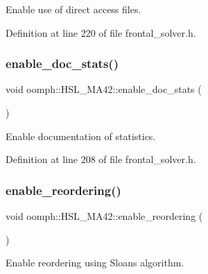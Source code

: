Enable use of direct access files. 



Definition at line 220 of file frontal\+\_\+solver.\+h.

\mbox{\label{classoomph_1_1HSL__MA42_a52f7aec686418a4210ab8bd010eb332a}} 
\subsubsection{\texorpdfstring{enable\+\_\+doc\+\_\+stats()}{enable\_doc\_stats()}}
{\footnotesize\ttfamily void oomph\+::\+H\+S\+L\+\_\+\+M\+A42\+::enable\+\_\+doc\+\_\+stats (\begin{DoxyParamCaption}{ }\end{DoxyParamCaption})\hspace{0.3cm}{\ttfamily [inline]}}



Enable documentation of statistics. 



Definition at line 208 of file frontal\+\_\+solver.\+h.

\mbox{\label{classoomph_1_1HSL__MA42_a889fe388a889c71316e26a15ed3e3d78}} 
\subsubsection{\texorpdfstring{enable\+\_\+reordering()}{enable\_reordering()}}
{\footnotesize\ttfamily void oomph\+::\+H\+S\+L\+\_\+\+M\+A42\+::enable\+\_\+reordering (\begin{DoxyParamCaption}{ }\end{DoxyParamCaption})\hspace{0.3cm}{\ttfamily [inline]}}



Enable reordering using Sloan\textquotesingle{}s algorithm. 



